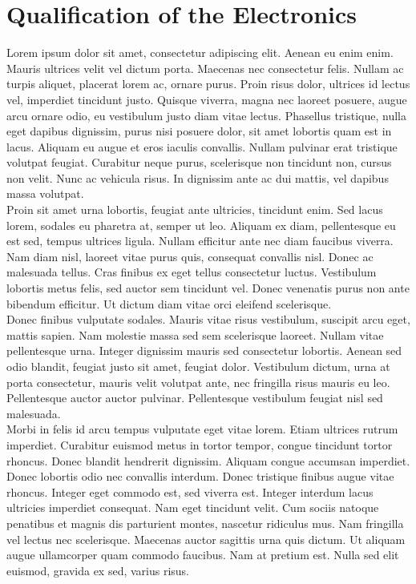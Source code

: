 \chapter{Qualification of the Electronics}
\label{chap:II-5-qualification}

Lorem ipsum dolor sit amet, consectetur adipiscing elit. Aenean eu enim enim. Mauris ultrices velit vel dictum porta. Maecenas nec consectetur felis. Nullam ac turpis aliquet, placerat lorem ac, ornare purus. Proin risus dolor, ultrices id lectus vel, imperdiet tincidunt justo. Quisque viverra, magna nec laoreet posuere, augue arcu ornare odio, eu vestibulum justo diam vitae lectus. Phasellus tristique, nulla eget dapibus dignissim, purus nisi posuere dolor, sit amet lobortis quam est in lacus. Aliquam eu augue et eros iaculis convallis. Nullam pulvinar erat tristique volutpat feugiat. Curabitur neque purus, scelerisque non tincidunt non, cursus non velit. Nunc ac vehicula risus. In dignissim ante ac dui mattis, vel dapibus massa volutpat. \\

Proin sit amet urna lobortis, feugiat ante ultricies, tincidunt enim. Sed lacus lorem, sodales eu pharetra at, semper ut leo. Aliquam ex diam, pellentesque eu est sed, tempus ultrices ligula. Nullam efficitur ante nec diam faucibus viverra. Nam diam nisl, laoreet vitae purus quis, consequat convallis nisl. Donec ac malesuada tellus. Cras finibus ex eget tellus consectetur luctus. Vestibulum lobortis metus felis, sed auctor sem tincidunt vel. Donec venenatis purus non ante bibendum efficitur. Ut dictum diam vitae orci eleifend scelerisque. \\

Donec finibus vulputate sodales. Mauris vitae risus vestibulum, suscipit arcu eget, mattis sapien. Nam molestie massa sed sem scelerisque laoreet. Nullam vitae pellentesque urna. Integer dignissim mauris sed consectetur lobortis. Aenean sed odio blandit, feugiat justo sit amet, feugiat dolor. Vestibulum dictum, urna at porta consectetur, mauris velit volutpat ante, nec fringilla risus mauris eu leo. Pellentesque auctor auctor pulvinar. Pellentesque vestibulum feugiat nisl sed malesuada. \\

Morbi in felis id arcu tempus vulputate eget vitae lorem. Etiam ultrices rutrum imperdiet. Curabitur euismod metus in tortor tempor, congue tincidunt tortor rhoncus. Donec blandit hendrerit dignissim. Aliquam congue accumsan imperdiet. Donec lobortis odio nec convallis interdum. Donec tristique finibus augue vitae rhoncus. Integer eget commodo est, sed viverra est. Integer interdum lacus ultricies imperdiet consequat. Nam eget tincidunt velit. Cum sociis natoque penatibus et magnis dis parturient montes, nascetur ridiculus mus. Nam fringilla vel lectus nec scelerisque. Maecenas auctor sagittis urna quis dictum. Ut aliquam augue ullamcorper quam commodo faucibus. Nam at pretium est. Nulla sed elit euismod, gravida ex sed, varius risus. \\

